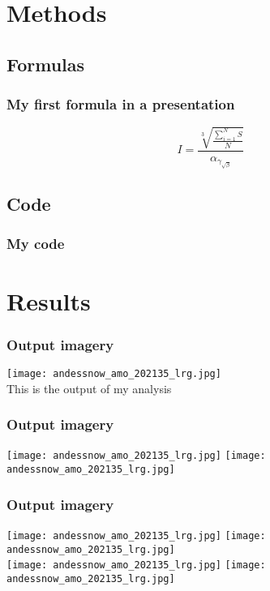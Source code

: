 \documentclass{beamer}
\begin{document}
%
\section{Methods}

\subsection{Formulas}
\begin{frame}
 \frametitle{My first formula in a presentation}
 \begin{equation}
  I=\frac{\sqrt[3]{\frac{\displaystyle\sum_{i=1}^{N} S}{N}}}{\alpha_{\gamma_{\sqrt{\beta}}}}
 \end{equation}
\end{frame}

\subsection{Code}
\begin{frame}
\frametitle{My code}
     
\end{frame}

\section{Results}

\begin{frame}
 \frametitle{Output imagery}
 \centering
 \texttt{[image: andessnow\_amo\_202135\_lrg.jpg]} \\
 \bigskip %
 This is the output of my analysis
\end{frame}

\begin{frame}
 \frametitle{Output imagery}
 \centering
 \texttt{[image: andessnow\_amo\_202135\_lrg.jpg]} 
 \texttt{[image: andessnow\_amo\_202135\_lrg.jpg]} 
\end{frame}

\begin{frame}
 \frametitle{Output imagery}
 \centering
 \texttt{[image: andessnow\_amo\_202135\_lrg.jpg]} 
 \texttt{[image: andessnow\_amo\_202135\_lrg.jpg]} \\
 \texttt{[image: andessnow\_amo\_202135\_lrg.jpg]} 
 \texttt{[image: andessnow\_amo\_202135\_lrg.jpg]}
\end{frame}
\end{document}
